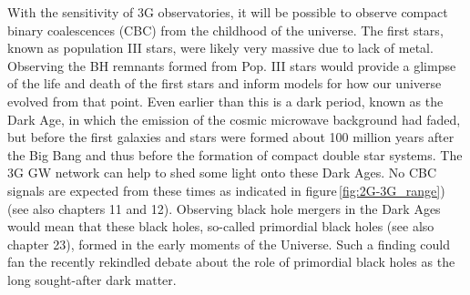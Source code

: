 \documentclass[graybox, nosecnum]{svmult}
\begin{document}
With the sensitivity of 3G observatories, it will be possible to observe compact binary coalescences (CBC) from the childhood of the universe.
The first stars, known as population III stars, were likely very massive due to lack of metal. Observing the BH remnants formed from Pop. III stars would provide a glimpse of the life and death of the first stars and inform models for how our universe evolved from that point. Even earlier than this is a dark period, known as the Dark Age, in which the emission of the cosmic microwave background had faded, but before the first galaxies and stars were formed about 100 million years after the Big Bang and thus before the formation of compact double star systems.  The 3G GW network can help to shed some light onto these Dark Ages. No CBC signals are expected from these times as indicated in figure\,\ref{fig:2G-3G_range}) {\color{green} (see also chapters 11 and 12)}. Observing black hole mergers in the Dark Ages would mean that these black holes, so-called primordial black holes{\color{green} (see also chapter 23)}, formed in the early moments of the Universe. 
Such a finding could fan the recently rekindled debate about the role of primordial black holes as the long sought-after dark matter. 
\end{document}
